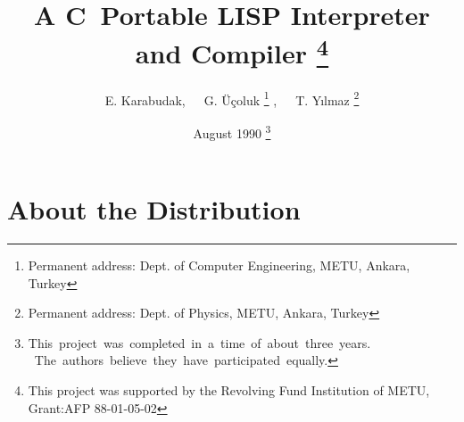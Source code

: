 %


\pagestyle{headings}
\textwidth 14cm
\renewcommand{\topfraction}{.9}
\renewcommand{\bottomfraction}{.9}
\renewcommand{\textfraction}{.1}
\renewcommand{\floatpagefraction}{.1}
\newcommand{\ptr}{\raisebox{-.5ex}{*}}
\renewcommand{\baselinestretch}{1.2}
\newcommand{\C}{{\bf C\  }}
\newcommand{\CC}{{\bf C}}
\newcommand{\B}[1]{\ {\bf #1 }\ }
\newcommand{\BB}[1]{\ {\bf #1}\ }

\title{A \C Portable LISP Interpreter and Compiler
    \thanks{This project was supported by the Revolving Fund
      Institution of METU, Grant:AFP 88-01-05-02}
        \vspace*{2cm} \\ \mbox{}
        }
\author{ E. Karabudak,\ \ \  G. \"{U}\c{c}oluk
        \thanks{Permanent address:
                               Dept. of Computer Engineering,
                               METU,
                               Ankara, Turkey}
         ,\ \  \     T. Y{\i}lmaz
        \thanks{Permanent address:
                               Dept. of Physics,
                               METU,
                               Ankara, Turkey}
       }
\date{August 1990
    \thanks{\mbox{This project was completed in a time of about three years.
       \hspace*{1cm}}
        \mbox{ \hspace*{4ex} The  authors  believe  they  have participated
                   equally.}}}




\maketitle
\tableofcontents
\newpage
\chapter{About the Distribution}

